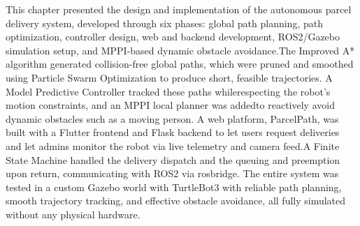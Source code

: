 This chapter presented the design and implementation of the autonomous parcel
delivery system, developed through six phases: global path planning, path
optimization, controller design, web and backend development, ROS2/Gazebo
simulation setup, and MPPI-based dynamic obstacle avoidance.The Improved A* algorithm generated collision-free global paths, which were
pruned and smoothed using Particle Swarm Optimization to produce short,
feasible trajectories. A Model Predictive Controller tracked these paths whilerespecting the robot's motion constraints, and an MPPI local planner was addedto reactively avoid dynamic obstacles such as a moving person.
A web platform, ParcelPath, was built with a Flutter frontend and Flask
backend to let users request deliveries and let admins monitor the robot via
live telemetry and camera feed.A Finite State Machine handled the delivery dispatch and the queuing and preemption upon return, communicating with ROS2 via rosbridge. The entire system was tested in a custom Gazebo world with TurtleBot3 with reliable path planning, smooth trajectory tracking, and effective obstacle avoidance, all fully simulated without any physical hardware.